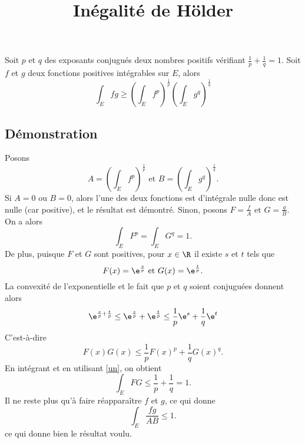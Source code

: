 \documentclass[fontsize=12pt,twoside=false,parskip=half, french]{scrartcl}
\title{Inégalité de Hölder}
\date{}
\author{}
\begin{document}
\maketitle
   \begin{Theoreme}
      Soit $p$ et $q$ des exposants conjugués \ie{} deux nombres positifs vérifiant
   $\frac{1}{p} + \frac{1}{q} = 1$.
   Soit $f$ et $g$ deux fonctions positives intégrables sur $E$, alors
      \[
         \int_Efg \geq \left(\int_E f^p \right)^{\frac{1}{p}}
                       \left(\int_E g^q \right)^{\frac{1}{q}}
      \]
   \end{Theoreme}
   \subsection{Démonstration}
      Posons
      \[
         A = \left(\int_E f^p \right)^{\frac{1}{p}} \text{ et } 
         B = \left(\int_E g^q \right)^{\frac{1}{q}}.
      \] 
      Si $A = 0$ ou $B = 0$, alors l’une des deux fonctions est d’intégrale       
      nulle donc est nulle (car positive), et le résultat est démontré. Sinon,
      posons $F = \frac{f}{A} \text{ et } G = \frac{g}{B}$. On a alors
      \begin{equation}\label{un}
         \int_E F^p = \int_E G^q = 1. 
      \end{equation}
      De plus, puisque $F$ et $G$ sont positives, pour $x \in \R$ il existe 
      $s$ et $t$ tels que
      \[
         F(x) = \e^{\frac{s}{p}} \text{ et } G(x) = \e^{\frac{t}{p}}.
      \]
      La convexité de l’exponentielle et le fait que $p$ et $q$ soient conjuguées
      donnent alors
      \[
         \e^{\frac{s}{p} + \frac{t}{p}} \leq \e^{\frac{s}{p}}+ \e^{\frac{t}{p}}
                                        \leq \frac{1}{p}\e^s + \frac{1}{q}\e^t
      \]
      C’est-à-dire
      \[
         F(x)G(x) \leq \frac{1}{p}F(x)^p + \frac{1}{q}G(x)^q.
      \]
      En intégrant et en utilisant \eqref{un}, on obtient
      \[
         \int_E FG \leq \frac{1}{p} + \frac{1}{q} = 1. 
      \]
      Il ne reste plus qu’à faire réapparaître $f$ et $g$, ce qui donne
      \[
         \int_E \frac{fg}{AB} \leq 1.         
      \]
      ce qui donne bien le résultat voulu.
\end{document}
